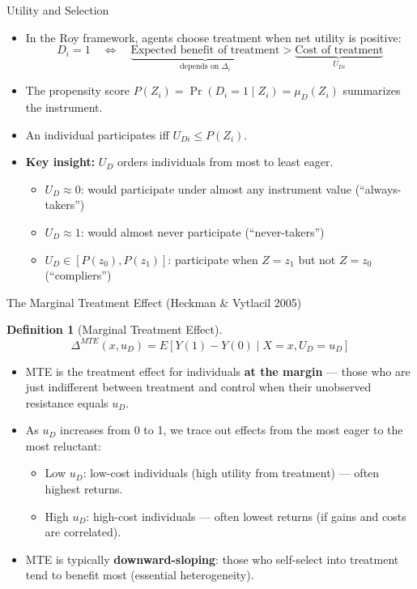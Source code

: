 \documentclass[aspectratio=169, handout]{beamer}
\newtheorem{defn}{Definition}
\numberwithin{equation}{section}
\begin{document}
\begin{frame}{Utility and Selection}
\begin{itemize}
\item In the Roy framework, agents choose treatment when net utility is positive:
$$D_i=1 \quad\Leftrightarrow\quad \underbrace{\text{Expected benefit of treatment}}_{\text{depends on }\Delta_i} > \underbrace{\text{Cost of treatment}}_{U_{Di}}$$
\item The propensity score $P(Z_i)=\Pr(D_i=1\mid Z_i)=\mu_D(Z_i)$ summarizes the instrument.
\item An individual participates iff $U_{Di}\leq P(Z_i)$.
\item \textbf{Key insight:} $U_D$ orders individuals from most to least eager.
\begin{itemize}
\item $U_D\approx 0$: would participate under almost any instrument value (``always-takers'')
\item $U_D\approx 1$: would almost never participate (``never-takers'')
\item $U_D\in[P(z_0), P(z_1)]$: participate when $Z=z_1$ but not $Z=z_0$ (``compliers'')
\end{itemize}
\end{itemize}
\end{frame}


\begin{frame}{The Marginal Treatment Effect (Heckman \& Vytlacil 2005)}
\begin{defn}[Marginal Treatment Effect]
$$\Delta^{MTE}(x, u_D) = E[Y(1)-Y(0)\mid X=x, U_D=u_D]$$
\end{defn}
\begin{itemize}
\item MTE is the treatment effect for individuals \textbf{at the margin} --- those who are just indifferent between treatment and control when their unobserved resistance equals $u_D$.
\item As $u_D$ increases from 0 to 1, we trace out effects from the most eager to the most reluctant:
\begin{itemize}
\item Low $u_D$: low-cost individuals (high utility from treatment) --- often highest returns.
\item High $u_D$: high-cost individuals --- often lowest returns (if gains and costs are correlated).
\end{itemize}
\item MTE is typically \textbf{downward-sloping}: those who self-select into treatment tend to benefit most (essential heterogeneity).
\end{itemize}
\end{frame}
\end{document}
